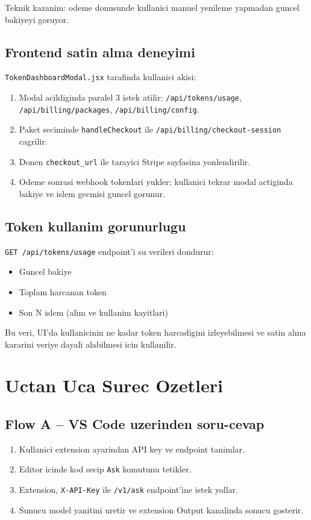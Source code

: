 \documentclass[11pt,a4paper]{article}
\begin{document}
Teknik kazanim: odeme donusunde kullanici manuel yenileme yapmadan guncel bakiyeyi goruyor.

\subsection{Frontend satin alma deneyimi}

\texttt{TokenDashboardModal.jsx} tarafinda kullanici akisi:
\begin{enumerate}[leftmargin=1.5em]
	\item Modal acildiginda paralel 3 istek atilir:
	\texttt{/api/tokens/usage}, \texttt{/api/billing/packages}, \texttt{/api/billing/config}.
	\item Paket seciminde \texttt{handleCheckout} ile \texttt{/api/billing/checkout-session} cagrilir.
	\item Donen \texttt{checkout\_url} ile tarayici Stripe sayfasina yonlendirilir.
	\item Odeme sonrasi webhook tokenlari yukler; kullanici tekrar modal actiginda bakiye ve islem gecmisi guncel gorunur.
\end{enumerate}

\subsection{Token kullanim gorunurlugu}

\texttt{GET /api/tokens/usage} endpoint'i su verileri dondurur:
\begin{itemize}[leftmargin=1.5em]
	\item Guncel bakiye
	\item Toplam harcanan token
	\item Son N islem (alim ve kullanim kayitlari)
\end{itemize}

Bu veri, UI'da kullanicinin ne kadar token harcadigini izleyebilmesi ve satin alma kararini veriye dayali alabilmesi icin kullanilir.

\section{Uctan Uca Surec Ozetleri}

\subsection{Flow A -- VS Code uzerinden soru-cevap}

\begin{enumerate}[leftmargin=1.5em]
	\item Kullanici extension ayarindan API key ve endpoint tanimlar.
	\item Editor icinde kod secip \texttt{Ask} komutunu tetikler.
	\item Extension, \texttt{X-API-Key} ile \texttt{/v1/ask} endpoint'ine istek yollar.
	\item Sunucu model yanitini uretir ve extension Output kanalinda sonucu gosterir.
\end{enumerate}
\end{document}
